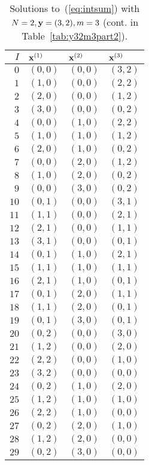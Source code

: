 \documentclass{article}
\begin{document}
\newpage
\begin{twocolumn}

\begin{table}
\begin{center}
\begin{tabular}{r|lll}
$I$ & ${\bf x}^{(1)}$ & ${\bf x}^{(2)}$ & ${\bf x}^{(3)}$
\\ \hline
$0$ & $(0,0)$ & $(0,0)$ & $(3,2)$ \\
$1$ & $(1,0)$ & $(0,0)$ & $(2,2)$ \\
$2$ & $(2,0)$ & $(0,0)$ & $(1,2)$ \\
$3$ & $(3,0)$ & $(0,0)$ & $(0,2)$ \\
$4$ & $(0,0)$ & $(1,0)$ & $(2,2)$ \\
$5$ & $(1,0)$ & $(1,0)$ & $(1,2)$ \\
$6$ & $(2,0)$ & $(1,0)$ & $(0,2)$ \\
$7$ & $(0,0)$ & $(2,0)$ & $(1,2)$ \\
$8$ & $(1,0)$ & $(2,0)$ & $(0,2)$ \\
$9$ & $(0,0)$ & $(3,0)$ & $(0,2)$
\\
$10$ & $(0,1)$ & $(0,0)$ & $(3,1)$ \\
$11$ & $(1,1)$ & $(0,0)$ & $(2,1)$ \\
$12$ & $(2,1)$ & $(0,0)$ & $(1,1)$ \\
$13$ & $(3,1)$ & $(0,0)$ & $(0,1)$ \\
$14$ & $(0,1)$ & $(1,0)$ & $(2,1)$ \\
$15$ & $(1,1)$ & $(1,0)$ & $(1,1)$ \\
$16$ & $(2,1)$ & $(1,0)$ & $(0,1)$ \\
$17$ & $(0,1)$ & $(2,0)$ & $(1,1)$ \\
$18$ & $(1,1)$ & $(2,0)$ & $(0,1)$ \\
$19$ & $(0,1)$ & $(3,0)$ & $(0,1)$
\\
$20$ & $(0,2)$ & $(0,0)$ & $(3,0)$ \\
$21$ & $(1,2)$ & $(0,0)$ & $(2,0)$ \\
$22$ & $(2,2)$ & $(0,0)$ & $(1,0)$ \\
$23$ & $(3,2)$ & $(0,0)$ & $(0,0)$ \\
$24$ & $(0,2)$ & $(1,0)$ & $(2,0)$ \\
$25$ & $(1,2)$ & $(1,0)$ & $(1,0)$ \\
$26$ & $(2,2)$ & $(1,0)$ & $(0,0)$ \\
$27$ & $(0,2)$ & $(2,0)$ & $(1,0)$ \\
$28$ & $(1,2)$ & $(2,0)$ & $(0,0)$ \\
$29$ & $(0,2)$ & $(3,0)$ & $(0,0)$
\end{tabular}
\end{center}
\caption{
\label{tab:y32m3part1}
Solutions to~(\ref{eq:intsum}) with $N=2, {\bf y}=(3,2), m=3$
(cont. in Table~\ref{tab:y32m3part2}).
}
\end{table}


\end{twocolumn}
\end{document}
